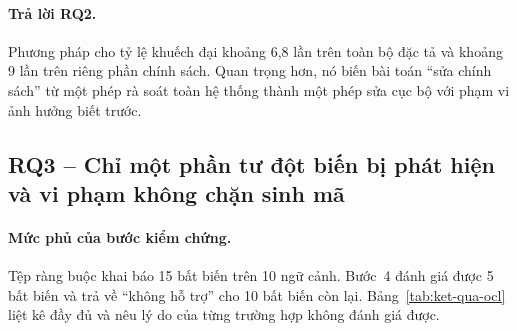 \paragraph{Trả lời RQ2.}
Phương pháp cho tỷ lệ khuếch đại khoảng 6,8 lần trên toàn bộ đặc tả và khoảng 9 lần trên riêng phần chính sách. Quan trọng hơn, nó biến bài toán ``sửa chính sách'' từ một phép rà soát toàn hệ thống thành một phép sửa cục bộ với phạm vi ảnh hưởng biết trước.

\subsection{RQ3 -- Chỉ một phần tư đột biến bị phát hiện và vi phạm không chặn sinh mã}

\paragraph{Mức phủ của bước kiểm chứng.}
Tệp ràng buộc khai báo 15 bất biến trên 10 ngữ cảnh. Bước~4 đánh giá được 5 bất biến và trả về ``không hỗ trợ'' cho 10 bất biến còn lại. Bảng~\ref{tab:ket-qua-ocl} liệt kê đầy đủ và nêu lý do của từng trường hợp không đánh giá được.

